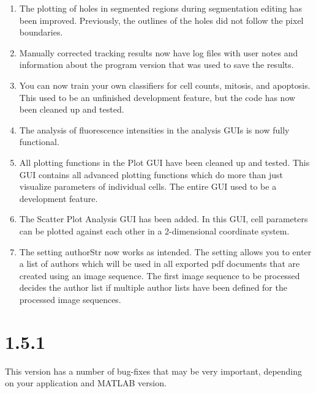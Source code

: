 \documentclass[a4paper, oneside, onecolumn, 11pt]{article}
\begin{document}
\begin{enumerate}
  \item The plotting of holes in segmented regions during segmentation editing has been improved. Previously, the outlines of the holes did not follow the pixel boundaries.
  \item Manually corrected tracking results now have log files with user notes and information about the program version that was used to save the results.
  \item You can now train your own classifiers for cell counts, mitosis, and apoptosis. This used to be an unfinished development feature, but the code has now been cleaned up and tested.
  \item The analysis of fluorescence intensities in the analysis GUIs is now fully functional.
  \item All plotting functions in the Plot GUI have been cleaned up and tested. This GUI contains all advanced plotting functions which do more than just visualize parameters of individual cells. The entire GUI used to be a development feature.
  \item The Scatter Plot Analysis GUI has been added. In this GUI, cell parameters can be plotted against each other in a 2-dimensional coordinate system.
  \item The setting authorStr now works as intended. The setting allows you to enter a list of authors which will be used in all exported pdf documents that are created using an image sequence. The first image sequence to be processed decides the author list if multiple author lists have been defined for the processed image sequences.
\end{enumerate}

\section*{1.5.1}
This version has a number of bug-fixes that may be very important, depending on your application and MATLAB version.
\end{document}
